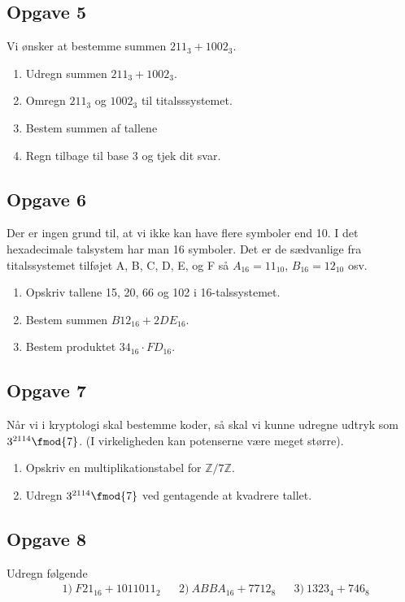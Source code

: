\subsection*{Opgave 5}
Vi ønsker at bestemme summen $211_3 + 1002_3$.
\begin{enumerate}[label=\roman*)]
	\item Udregn summen $211_3 + 1002_3$.
	\item Omregn $211_3$ og $1002_3$ til titalsssystemet.
	\item Bestem summen af tallene
	\item Regn tilbage til base 3 og tjek dit svar.
\end{enumerate}

\subsection*{Opgave 6}
Der er ingen grund til, at vi ikke kan have flere symboler end 10. I det hexadecimale talsystem har man 16 symboler. Det er de sædvanlige fra titalssystemet tilføjet A, B, C, D, E, og F så $A_{16} = 11_{10}$, $B_{16} = 12_{10}$ osv.
\begin{enumerate}[label=\roman*)	]
	\item Opskriv tallene 15, 20, 66 og 102 i 16-talssystemet.
	\item Bestem summen $B12_{16}+2DE_{16}$. 
	\item Bestem produktet $34_{16}\cdot  FD_{16}$.
\end{enumerate}

\subsection*{Opgave 7}
Når vi i kryptologi skal bestemme koder, så skal vi kunne udregne udtryk som $3^{2114} \fmod{7}$. (I virkeligheden kan potenserne være meget større).
\begin{enumerate}[label=\roman*)]
	\item Opskriv en multiplikationstabel for $\mathbb{Z}/7\mathbb{Z}$. 
	\item Udregn $3^{2114} \fmod{7}$ ved gentagende at kvadrere tallet. 
\end{enumerate}

\subsection*{Opgave 8}
Udregn følgende
\begin{align*}
	&1) \ F21_{16} + 1011011_{2}   &&2) \ ABBA_{16} +  7712_{8}   &&3) \  1323_4 + 746_8  \\
\end{align*}